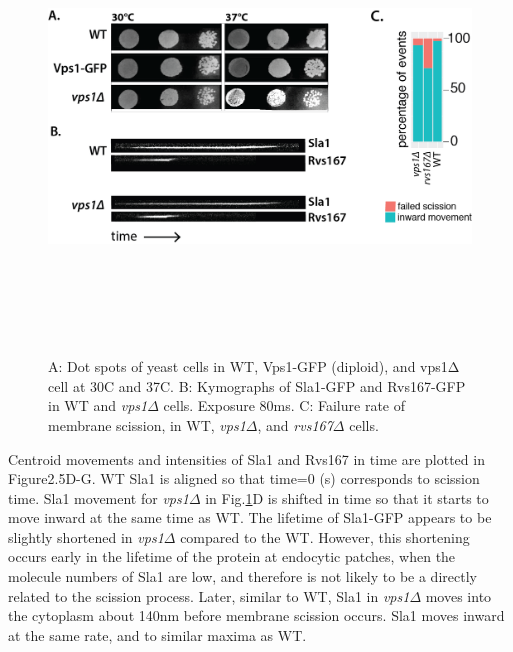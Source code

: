 \vspace{3mm}
	\begin{figure}[H]
	\centering
	\includegraphics[width=12cm,height=12cm,keepaspectratio]{figures/results_final/vps1}
	\caption[Phenotype of \textit{vps1$\Delta$}]
	{A: Dot spots of yeast cells in WT, Vps1-GFP (diploid), and vps1Δ cell at 30C and 37C. 
		B: Kymographs of Sla1-GFP and Rvs167-GFP in WT and \textit{vps1$\Delta$} cells. Exposure 80ms.  
		C: Failure rate of membrane scission, in WT, \textit{vps1$\Delta$}, and \textit{rvs167$\Delta$}  cells. 
		\label{fig4_vpsdel1}}
\end{figure}


\vspace{2mm}

Centroid movements and intensities of Sla1 and Rvs167 in time are plotted in Figure2.5D-G. WT Sla1 is aligned so that time=0 (s) corresponds to scission time. Sla1 movement for \textit{vps1$\Delta$}   in Fig.\ref{fig4_vpsdel1}D is shifted in time so that it starts to move inward at the same time as WT. The lifetime of Sla1-GFP appears to be slightly shortened in \textit{vps1$\Delta$}   compared to the WT. However, this shortening occurs early in the lifetime of the protein at endocytic patches, when the molecule numbers of Sla1 are low, and therefore is not likely to be a directly related to the scission process. Later, similar to WT, Sla1 in \textit{vps1$\Delta$}  moves into the cytoplasm about 140nm before membrane scission occurs. Sla1 moves inward at the same rate, and to similar maxima as WT. 


